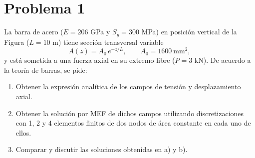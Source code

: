 \section*{Problema 1}


La barra de acero ($E = 206$ GPa y $S_y = 300$ MPa) en posici\'on vertical de la Figura ($L = 10$ m) tiene secci\'on transversal variable
\[
A(z) = A_0\, e^{-z/L}, \qquad A_0 = 1600\ \text{mm}^2,
\]
y est\'a sometida a una fuerza axial en su extremo libre ($P = 3$ kN). De acuerdo a la teor\'ia de barras, se pide:

\begin{enumerate}[label=\alph*), itemsep=4pt]
    \item Obtener la expresi\'on anal\'itica de los campos de tensi\'on y desplazamiento axial.
    \item Obtener la soluci\'on por MEF de dichos campos utilizando discretizaciones con 1, 2 y 4 elementos finitos de dos nodos de \'area constante en cada uno de ellos.
    \item Comparar y discutir las soluciones obtenidas en a) y b).
\end{enumerate}

\begin{center}
\label{fig:barra}
\end{center}

\vspace{0.7cm}

